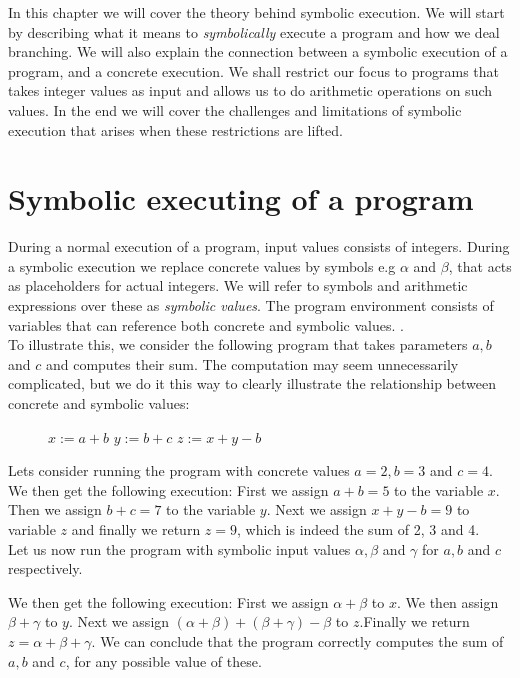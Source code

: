 In this chapter we will cover the theory behind symbolic execution. We will start by describing what it means to \emph{symbolically} execute a program and how we deal branching. We will also explain the connection between a symbolic execution of a program, and a concrete execution. We shall restrict our focus to programs that takes integer values as input and allows us to do arithmetic operations on such values. In the end we will cover the challenges and limitations of symbolic execution that arises when these restrictions are lifted. 


\section{Symbolic executing of a program}
	
	During a normal execution of a program, input values consists of integers. During a symbolic execution we replace concrete values by symbols e.g $\alpha$ and $ \beta$, that acts as placeholders for actual integers. We will refer to symbols and arithmetic expressions over these as \emph{symbolic values}.
	 The program environment consists of variables that can reference both concrete and symbolic values. \cite{CadarSen13} \cite{King76}.
	\\
	To illustrate this, we consider the following program that takes parameters $a, b$ and $ c$ and computes their sum. The computation may seem unnecessarily complicated, but we do it this way to clearly illustrate the relationship between concrete and symbolic values:
	\begin{figure}[!h]
		\begin{algorithmic}
			\State $ x := a + b$
			\State $ y := b + c$
			\State $ z := x + y - b$
			\State {}
			\EndProcedure
		\end{algorithmic}
	\end{figure}

	\sumprogram{}
	\newpage
	Lets consider running the program with concrete values $a = 2, b = 3$ and $c = 4$. We then get the following execution:
	First we assign $a+b = 5$ to the variable $x$. Then we assign $b + c = 7$ to the variable $y$. Next we assign $x + y - b = 9$ to variable $z$ and finally we return $z = 9$, which is indeed the sum of 2, 3 and 4. 
	\\
	Let us now run the program with symbolic input values $\alpha, \beta$ and $\gamma$ for $a, b$ and $c$ respectively. 

	
	We then get the following execution: First we assign $\alpha + \beta$ to $x$. We then assign $\beta + \gamma$ to $y$. Next we assign $(\alpha + \beta) + (\beta + \gamma) - \beta$ to $z$.Finally we return $z = \alpha + \beta + \gamma$. We can conclude that the program correctly computes the sum of $a, b$ and $c$, for any possible value of these.
	
